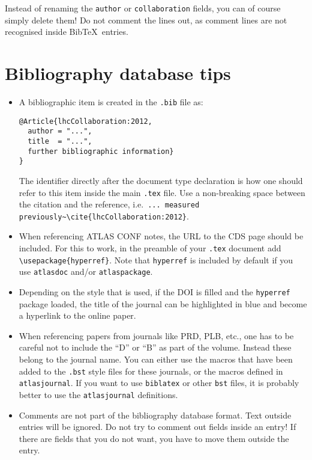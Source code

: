 \documentclass[UKenglish,texlive=2013]{latex/atlasdoc}
\newcommand*{\BibTeX}{Bib\TeX}
\newcommand{\File}[1]{\texttt{#1}\xspace}
\newcommand{\Package}[1]{\texttt{#1}\xspace}
\begin{document}
Instead of renaming the \texttt{author} or \texttt{collaboration} fields, you can of course simply delete them!
Do not comment the lines out, as comment lines are not recognised inside \BibTeX\ entries.


\section{Bibliography database tips}

\begin{itemize}
\item A bibliographic item is created in the \File{.bib} file as:
\begin{verbatim}
@Article{lhcCollaboration:2012,
  author = "...",
  title  = "...",
  further bibliographic information}
}
\end{verbatim}
  The identifier directly after the document type declaration is how one should refer to this item inside the main \File{.tex} file.
  Use a non-breaking space between the citation and the reference, i.e.\
  \verb|... measured previously~\cite{lhcCollaboration:2012}|.
\item When referencing ATLAS CONF notes, the URL to the CDS page should be included.
  For this to work, in the preamble of your \File{.tex} document add
  \texttt{\textbackslash usepackage\{hyperref\}}.
  Note that \Package{hyperref} is included by default if you use \Package{atlasdoc} and/or \Package{atlaspackage}.
\item Depending on the style that is used,
  if the DOI is filled and the \texttt{hyperref} package loaded, 
  the title of the journal can be highlighted in blue and become a hyperlink to the online paper.
\item When referencing papers from journals like PRD, PLB, etc.,
  one has to be careful not to include the \enquote{D} or \enquote{B} as part of the volume.
  Instead these belong to the journal name. 
  You can either use the macros that have been added to the \File{.bst} style files for these journals, or
  the macros defined in \Package{atlasjournal}.
  If you want to use \Package{biblatex} or other \File{bst} files, it is probably better to use the
  \Package{atlasjournal} definitions.
\item Comments are not part of the bibliography database format. Text outside entries will be ignored.
  Do not try to comment out fields inside an entry!
  If there are fields that you do not want, you have to move them outside the entry.
\end{itemize}
\end{document}
